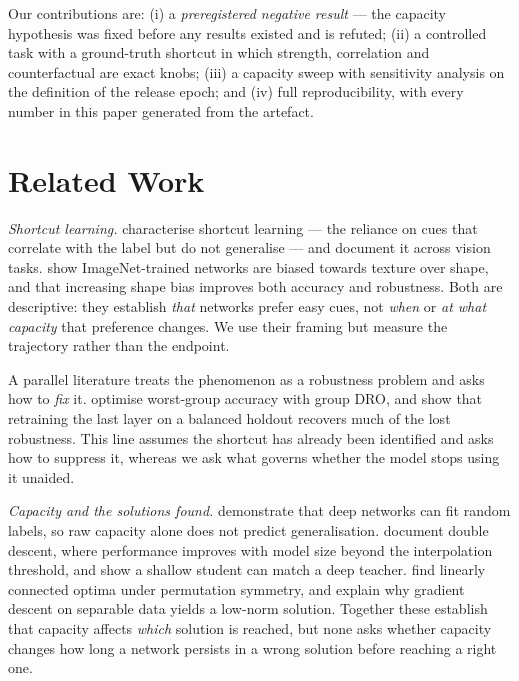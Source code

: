 \documentclass[conference]{IEEEtran}
\begin{document}
Our contributions are: (i) a \emph{preregistered negative result} --- the capacity
hypothesis was fixed before any results existed and is refuted; (ii) a controlled task with
a ground-truth shortcut in which strength, correlation and counterfactual are exact knobs;
(iii) a capacity sweep with sensitivity analysis on the definition of the release epoch;
and (iv) full reproducibility, with every number in this paper generated from the artefact.

\section{Related Work}

\textit{Shortcut learning.} \cite{geirhos2020shortcut} characterise shortcut learning ---
the reliance on cues that correlate with the label but do not generalise --- and document
it across vision tasks. \cite{geirhos2019texture} show ImageNet-trained networks are biased
towards texture over shape, and that increasing shape bias improves both accuracy and
robustness. Both are descriptive: they establish \emph{that} networks prefer easy cues, not
\emph{when} or \emph{at what capacity} that preference changes. We use their framing but
measure the trajectory rather than the endpoint.

A parallel literature treats the phenomenon as a robustness problem and asks how to
\emph{fix} it. \cite{sagawa2020groupdro} optimise worst-group accuracy with group DRO, and
\cite{kirichenko2023retrain} show that retraining the last layer on a balanced holdout
recovers much of the lost robustness. This line assumes the shortcut has already been
identified and asks how to suppress it, whereas we ask what governs whether the model stops
using it unaided.

\textit{Capacity and the solutions found.} \cite{zhang2017rethinking} demonstrate that deep
networks can fit random labels, so raw capacity alone does not predict generalisation.
\cite{nakkiran2021double} document double descent, where performance improves with model
size beyond the interpolation threshold, and \cite{ba2014deep} show a shallow student can
match a deep teacher. \cite{frankle2020mode} find linearly connected optima under
permutation symmetry, and \cite{soudry2018implicit} explain why gradient descent on
separable data yields a low-norm solution. Together these establish that capacity affects
\emph{which} solution is reached, but none asks whether capacity changes how long a network
persists in a wrong solution before reaching a right one.
\end{document}
